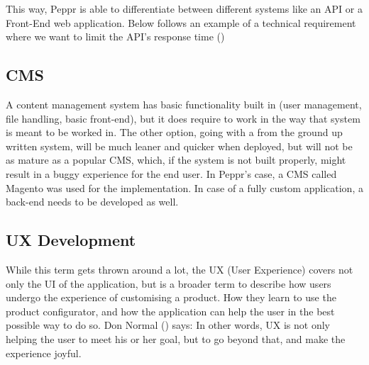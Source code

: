 \newline

This way, Peppr is able to differentiate between different systems like an API or a Front-End web application. Below follows an example of a technical requirement where we want to limit the API's response time (\cite{Response Times})\newline

\newline

\subsection{CMS}
A content management system has basic functionality built in (user management, file handling, basic front-end), but it does require to work in the way that system is meant to be worked in. The other option, going with a from the ground up written system, will be much leaner and quicker when deployed, but will not be as mature as a popular CMS, which, if the system is not built properly, might result in a buggy experience for the end user. In Peppr's case, a CMS called Magento was used for the implementation. In case of a fully custom application, a back-end needs to be developed as well.

\subsection{UX Development}
While this term gets thrown around a lot, the UX (User Experience) covers not only the UI of the application, but is a broader term to describe how users undergo the experience of customising a product. How they learn to use the product configurator, and how the application can help the user in the best possible way to do so. Don Normal (\cite{User Experience}) says: \newline
{} \newline
In other words, UX is not only helping the user to meet his or her goal, but to go beyond that, and make the experience joyful.

